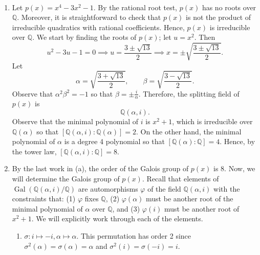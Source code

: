 \documentclass{article}
\begin{document}
\begin{solutions}
	$ $\newline \vspace{-1cm}
	\begin{enumerate}[itemsep =-2pt,label = (\alph{*})]
		\item Let $p(x) = x^{4} - 3x^{2} - 1$. By the rational root test, $p(x)$ has no roots over $\mathbb{Q}$. Moreover, it is straightforward to check that $p(x)$ is not the product of irreducible quadratics with rational coefficients. Hence, $p(x)$ is irreducible over $\mathbb{Q}$. We start by finding the roots of $p(x)$; let $u = x^{2}$. Then 
			\begin{equation}
				u^{2} - 3u - 1 = 0 \implies u = \frac{3 \pm \sqrt{13}}{2} \implies x = \pm \sqrt{\frac{3 \pm \sqrt{13}}{2}}. 
			\end{equation}
		Let 
			\begin{equation}
				\alpha = \sqrt{\frac{3 + \sqrt{13}}{2}}, \qquad \beta = \sqrt{\frac{3 - \sqrt{13}}{2}}. 
			\end{equation}
		Observe that $\alpha^{2}\beta^{2} = -1$ so that $\beta = \pm \frac{i}{\alpha}$. Therefore, the splitting field of $p(x)$ is 
			\begin{equation}
				\mathbb{Q}(\alpha, i). 
			\end{equation}
		Observe that the minimal polynomial of $i$ is $x^{2} + 1$, which is irreducible over $\mathbb{Q}(\alpha)$ so that $[\mathbb{Q}(\alpha, i):\mathbb{Q}(\alpha)] = 2$. On the other hand, the minimal polynomial of $\alpha$ is a degree 4 polynomial so that $[\mathbb{Q}(\alpha): \mathbb{Q}] = 4$. Hence, by the tower law, $[\mathbb{Q}(\alpha, i): \mathbb{Q}] = 8$. 
		\item By the last work in (a), the order of the Galois group of $p(x)$ is $8$. Now, we will determine the Galois group of $p(x)$. Recall that elements of $\operatorname{Gal}(\mathbb{Q}(\alpha, i)/\mathbb{Q})$ are automorphisms $\varphi$ of the field $\mathbb{Q}(\alpha, i)$ with the constraints that: (1) $\varphi$ fixes $\mathbb{Q}$, (2) $\varphi(\alpha)$ must be another root of the minimal polynomial of $\alpha$ over $\mathbb{Q}$, and (3) $\varphi(i)$ must be another root of $x^{2} + 1$. We will explicitly work through each of the elements. 
			\begin{enumerate}[itemsep =-2pt,label =(\roman{*})]
				\item $\sigma: i \mapsto -i, \alpha \mapsto \alpha$. This permutation has order 2 since $\sigma^{2}(\alpha)  = \sigma(\alpha) = \alpha$ and $\sigma^{2}(i) = \sigma(-i) = i$. 

\end{enumerate}
\end{enumerate}
\end{solutions}
\end{document}
